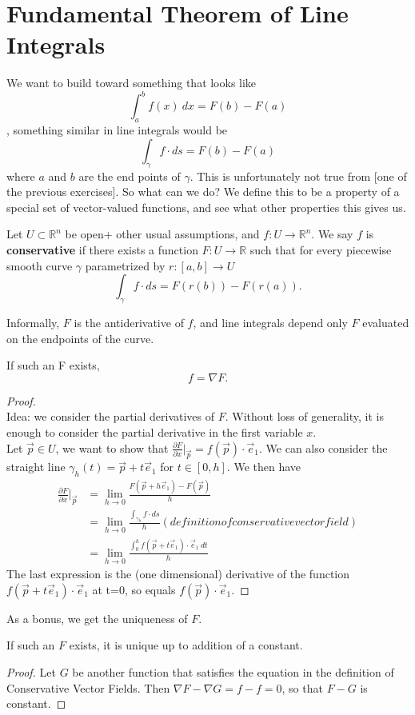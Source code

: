 \documentclass[11pt,openany]{book}
\newcommand{\definition}[2]{\begin{tcolorbox}[title=Definition ({#1}),colframe=black]{#2}\end{tcolorbox}
}
\newcommand{\proposition}[1]{\begin{tcolorbox}[title=Proposition,colframe=gray]{#1}\end{tcolorbox}
}
\begin{document}
	\section*{Fundamental Theorem of Line Integrals}
	We want to build toward something that looks like 
	\[
		\int_{a}^{b} f(x) \ dx = F(b) - F(a)
	\], something similar in line integrals would be \[
		\int_\gamma f \cdot ds = F(b) - F(a)
	\] where $a$ and $b$ are the end points of $\gamma$. This is unfortunately not true from [one of the previous exercises]. So what can we do? We define this to be a property of a special set of vector-valued functions, and see what other properties this gives us.
	
	\definition{Conservative Vector Fields}{
		Let $U\subset\mathbb{R}^n$ be open+ other usual assumptions, and $f:U\to\mathbb{R}^n$. We say $f$ is \textbf{conservative} if there exists a function $F:U\to\mathbb{R}$ such that for every piecewise smooth curve $\gamma$ parametrized by $r: [a,b]\to U$
		\[
			\int_\gamma f \cdot ds = F(r(b)) - F(r(a)).
		\] 
	}
	Informally, $F$ is the antiderivative of $f$, and line integrals depend only $F$ evaluated on the endpoints of the curve.
	\proposition{
		If such an F exists, \[
			f = \nabla F.
		\]
	}
	\begin{proof} \ \\
		Idea: we consider the partial derivatives of $F$. Without loss of generality, it is enough to consider the partial derivative in the first variable $x$. \\
		Let $\vec{p} \in U$, we want to show that $\frac{\partial F}{\partial x} \big| _{\vec{p}} = f(\vec{p}) \cdot \vec{e}_1$. We can also consider the straight line $\gamma_h(t) = \vec{p} + t\vec{e}_1$ for $t\in[0,h]$. We then have \begin{align*}
			\frac{\partial F}{\partial x} \big| _{\vec{p}} &= \lim_{h\to 0} \frac{F(\vec{p}+h\vec{e}_1)-F(\vec{p})}{h} \\
			&= \lim_{h\to 0} \frac{\int_{\gamma_h} f \cdot ds}{h} (definition of conservative vector field)\\
			&= \lim_{h\to 0} \frac{\int_0^h f(\vec{p}+t\vec{e}_1) \cdot \vec{e}_1 \ dt}{h}
		\end{align*}
		The last expression is the (one dimensional) derivative of the function $f(\vec{p}+t\vec{e}_1) \cdot \vec{e}_1$ at t=0, so equals $f(\vec{p})\cdot \vec{e}_1$.
	\end{proof}
	
	As a bonus, we get the uniqueness of $F$.
	\proposition{
		If such an $F$ exists, it is unique up to addition of a constant.
	}
	\begin{proof}
		Let $G$ be another function that satisfies the equation in the definition of Conservative Vector Fields. Then $\nabla F - \nabla G = f-f =0$, so that $F-G$ is constant.
	\end{proof}
	
\end{document}
